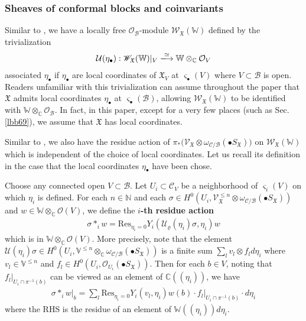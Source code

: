 \documentclass[11pt,b5paper,notitlepage]{article}
\theoremstyle{definition}
\theoremstyle{plain}
\newcommand{\fk}{\mathfrak}
\newcommand{\mc}{\mathcal}
\newcommand{\Res}{\mathrm{Res}}
\newcommand{\SV}{\mathscr{V}}
\newcommand{\scr}{\mathscr}
\newcommand{\sgm}{\varsigma}
\newcommand{\SX}{{S_{\fk X}}}
\newcommand{\blt}{\bullet}
\newcommand{\Vbb}{\mathbb V}
\newcommand{\Wbb}{\mathbb W}
\newcommand{\Cbb}{\mathbb C}
\newcommand{\Nbb}{\mathbb N}
\newcommand{\<}{\left\langle}
\renewcommand{\>}{\right\rangle}
\newcommand{\MO}{\mathcal{O}}
\newcommand{\MU}{\mathcal{U}}
\newcommand{\MC}{\mathcal{C}}
\newcommand{\MB}{\mathcal{B}}
\newcommand{\fx}{\mathfrak{X}}
\newcommand{\SW}{\mathscr{W}}
\numberwithin{equation}{section}
\begin{document}
\subsubsection{Sheaves of conformal blocks and coinvariants}\label{lbb10}



Similar to  \cite[Def. 2.11]{GZ1}, we have a locally free $\MO_\MB$-module $\SW_\fx(\Wbb)$ defined by the trivialization
\begin{align*}
\mathcal U(\eta_\blt):\scr W_\fx(\Wbb)|_V\xlongrightarrow{\simeq}\Wbb\otimes_\Cbb\mc O_V
\end{align*}
associated $\eta_\blt$ if $\eta_\blt$ are local coordinates of $\fx_V$ at $\sgm_\blt(V)$ where $V\subset\MB$ is open. Readers unfamiliar with this trivialization can assume throughout the paper that $\fx$ admits local coordinates $\eta_\blt$ at $\sgm_\blt(\MB)$, allowing $\scr W_\fx(\Wbb)$ to be identified with $\Wbb\otimes_\Cbb\mc O_\MB$. In fact, in this paper, except for a very few places (such as Sec. \ref{lbb69}), we assume that $\fx$ has local coordinates.

Similar to \cite[Def. 2.15]{GZ1}, we also have the residue action of $\pi_*\big(\SV_{\fx}\otimes \omega_{\MC/\MB}(\blt S_\fx)\big)$ on $\SW_\fx(\Wbb)$ which is independent of the choice of local coordinates. Let us recall its definition in the case that the local coordinates $\eta_\blt$ have been chose. 


Choose any connected open $V\subset\MB$. Let $U_i\subset\MC_V$ be a neighborhood of $\sgm_i(V)$ on which $\eta_i$ is defined. For each $n\in\Nbb$ and each $\sigma\in H^0(U_i,\scr V_\fx^{\leq n}\otimes\omega_{\MC/\MB}(\blt\SX))$ and $w\in\Wbb\otimes_\Cbb\MO(V)$, we define the \textbf{$i$-th residue action}
\begin{align}
\sigma*_i w=\Res_{\eta_i=0}Y_i(\MU_\varrho(\eta_i)\sigma,\eta_i)w
\end{align}
which is in $\Wbb\otimes_\Cbb\MO(V)$. More precisely, note that
the element $\mc U(\eta_i)\sigma\in H^0(U_i,\Vbb^{\leq n}\otimes_\Cbb\omega_{\MC/\MB}(\blt\SX))$ is a finite sum $\sum_l v_l\otimes f_ld\eta_i$ where $v_l\in\Vbb^{\leq n}$ and $f_l\in H^0(U_i,\MO_{U_i}(\blt\SX))$. Then for each $b\in V$, noting that $f_l|_{U_i\cap\pi^{-1}(b)}$ can be viewed as an element of $\Cbb((\eta_i))$, we have
\begin{align*}
\sigma*_iw\big|_b=\sum_l\Res_{\eta_i=0} Y_i(v_l,\eta_i)w(b)\cdot f_l|_{U_i\cap\pi^{-1}(b)}\cdot d\eta_i
\end{align*}
where the RHS is the residue of an element of $\Wbb((\eta_i))d\eta_i$.
\end{document}
